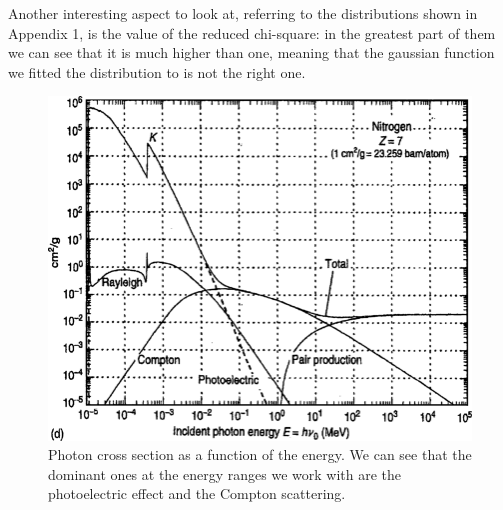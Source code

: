 \documentclass[a4paper]{article}
\begin{document}
Another interesting aspect to look at, referring to the distributions shown in Appendix 1, is the value of the reduced chi-square: in the greatest part of them we can see that it is much higher than one, meaning that the gaussian function we fitted the distribution to is not the right one.
\begin{figure}[H]
  \centering
  \includegraphics[width=0.6\columnwidth]{photon_cross.png}
  \caption{Photon cross section as a function of the energy. We can see that the dominant ones at the energy ranges we work with are the photoelectric effect and the Compton scattering.}
  \label{fig:cross}
\end{figure}
\end{document}
